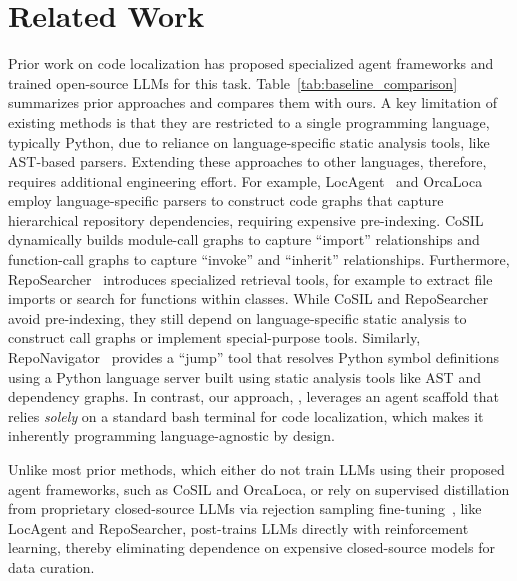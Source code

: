 
\section{Related Work}
\label{sec:background}
Prior work on code localization has proposed specialized agent frameworks and trained open-source LLMs for this task. Table~\ref{tab:baseline_comparison} summarizes prior approaches and compares them with ours. A key limitation of existing methods is that they are restricted to a single programming language, typically Python, due to reliance on language-specific static analysis tools, like AST-based parsers. Extending these approaches to other languages, therefore, requires additional engineering effort. For example, LocAgent~\citep{chen-etal-2025-locagent} and OrcaLoca~\citep{yu2025orcalocallmagentframework} employ language-specific parsers to construct code graphs that capture hierarchical repository dependencies, requiring expensive pre-indexing. CoSIL~\citep{jiang2025issuelocalizationllmdriveniterative} dynamically builds module-call graphs to capture ``import'' relationships and function-call graphs to capture ``invoke'' and ``inherit'' relationships. Furthermore, RepoSearcher~\citep{ma2025toolintegratedreinforcementlearningrepo} introduces specialized retrieval tools, for example to extract file imports or search for functions within classes. While CoSIL and RepoSearcher avoid pre-indexing, they still depend on language-specific static analysis to construct call graphs or implement special-purpose tools. Similarly, RepoNavigator~\citep{zhang2025one} provides a ``jump'' tool that resolves Python symbol definitions using a Python language server built using static analysis tools like AST and dependency graphs. In contrast, our approach, \methodname, leverages an agent scaffold that relies \emph{solely} on a standard bash terminal for code localization, which makes it inherently programming language-agnostic by design.

Unlike most prior methods, which either do not train LLMs using their proposed agent frameworks, such as CoSIL and OrcaLoca, or rely on supervised distillation from proprietary closed-source LLMs via rejection sampling fine-tuning~\citep{yuan2023scalingrelationshiplearningmathematical}, like LocAgent and RepoSearcher, \methodname post-trains LLMs directly with reinforcement learning, thereby eliminating dependence on expensive closed-source models for data curation.

